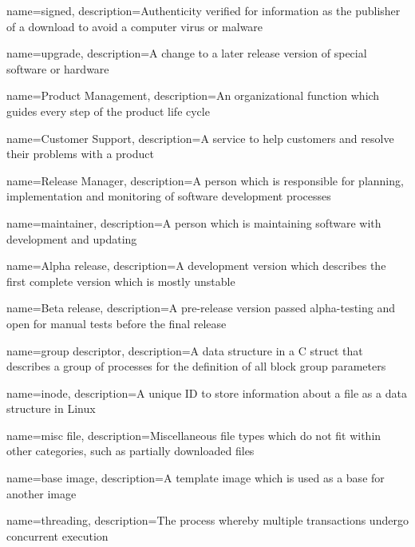 {
    name={signed},
    description={Authenticity verified for information as the publisher of a download to avoid a computer virus or malware}
}

{
    name={upgrade},
    description={A change to a later release version of special software or hardware}
}

{
    name={Product Management},
    description={An organizational function which guides every step of the product life cycle}
}

{
    name={Customer Support},
    description={A service to help customers and resolve their problems with a product}
}

{
    name={Release Manager},
    description={A person which is responsible for planning, implementation and monitoring of software development processes}
}

{
    name={maintainer},
    description={A person which is maintaining software with development and updating}
}

{
    name={Alpha release},
    description={A development version which describes the first complete version which is mostly unstable}
}

{
    name={Beta release},
    description={A pre-release version passed alpha-testing and open for manual tests before the final release}
}

{
    name={group descriptor},
    description={A data structure in a C struct that describes a group of processes for the definition of all block group parameters}
}

{
    name={inode},
    description={A unique ID to store information about a file as a data structure in Linux}
}

{
    name={misc file},
    description={Miscellaneous file types which do not fit within other categories, such as partially downloaded files}
}

{
    name={base image},
    description={A template image which is used as a base for another image}
}

{
    name={threading},
    description={The process whereby multiple transactions undergo concurrent execution}
}

